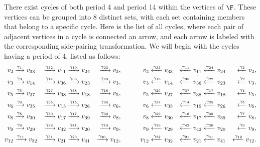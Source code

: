 There exist cycles of both period 4 and period 14 within the vertices of $\F$.
These vertices can be grouped into 8 distinct sets, with each set containing members that belong to a specific cycle.
Here is the list of all cycles, where each pair of adjacent vertices in a cycle is connected an arrow, and each arrow is labeled with the corresponding side-pairing transformation.
We will begin with the cycles having a period of 4, listed as follows:
\begin{alignat}{6}
v_{2}
& \xrightarrow{\gamma_{1}} v_{33}
& \xrightarrow{\gamma_{32}} v_{11}
& \xrightarrow{\gamma_{10}} v_{24}
& \xrightarrow{\gamma_{23}} v_{2},\qquad  &&
v_{2}
& \xleftarrow{\gamma_{33}} v_{33}
& \xleftarrow{\gamma_{11}} v_{11}
& \xleftarrow{\gamma_{24}} v_{24}
& \xleftarrow{\gamma_{2}} v_{2}, \notag \\
v_{3}
& \xrightarrow{\gamma_{3}} v_{14}
& \xrightarrow{\gamma_{14}} v_{36}
& \xrightarrow{\gamma_{36}} v_{23}
& \xrightarrow{\gamma_{23}} v_{3},\qquad &&
v_{3}
& \xleftarrow{\gamma_{13}} v_{14}
& \xleftarrow{\gamma_{35}} v_{36}
& \xleftarrow{\gamma_{22}} v_{23}
& \xleftarrow{\gamma_{2}} v_{3},\notag \\
v_{5}
& \xrightarrow{\gamma_{5}} v_{27}
& \xrightarrow{\gamma_{27}} v_{38}
& \xrightarrow{\gamma_{38}} v_{18}
& \xrightarrow{\gamma_{18}} v_{5},\qquad &&
v_{5}
& \xleftarrow{\gamma_{26}} v_{27}
& \xleftarrow{\gamma_{37}} v_{38}
& \xleftarrow{\gamma_{17}} v_{18}
& \xleftarrow{\gamma_{4}} v_{5}, \notag \\
v_{6}
& \xrightarrow{\gamma_{6}} v_{35}
& \xrightarrow{\gamma_{35}} v_{15}
& \xrightarrow{\gamma_{15}} v_{26}
& \xrightarrow{\gamma_{26}} v_{6},\qquad &&
v_{6}
& \xleftarrow{\gamma_{34}} v_{35}
& \xleftarrow{\gamma_{14}} v_{15}
& \xleftarrow{\gamma_{25}} v_{26}
& \xleftarrow{\gamma_{5}} v_{6}, \notag \\
v_{8}
& \xrightarrow{\gamma_{8}} v_{30}
& \xrightarrow{\gamma_{30}} v_{17}
& \xrightarrow{\gamma_{17}} v_{39}
& \xrightarrow{\gamma_{39}} v_{8},\qquad &&
v_{8}
& \xleftarrow{\gamma_{29}} v_{30}
& \xleftarrow{\gamma_{16}} v_{17}
& \xleftarrow{\gamma_{38}} v_{39}
& \xleftarrow{\gamma_{7}} v_{8}, \notag \\
v_{9}
& \xrightarrow{\gamma_{8}} v_{29}
& \xrightarrow{\gamma_{28}} v_{42}
& \xrightarrow{\gamma_{41}} v_{20}
& \xrightarrow{\gamma_{19}} v_{9},\qquad &&
v_{9}
& \xleftarrow{\gamma_{29}} v_{29}
& \xleftarrow{\gamma_{42}} v_{42}
& \xleftarrow{\gamma_{20}} v_{20}
& \xleftarrow{\gamma_{9}} v_{9}, \notag \\
v_{12}
& \xrightarrow{\gamma_{11}} v_{32}
& \xrightarrow{\gamma_{31}} v_{21}
& \xrightarrow{\gamma_{20}} v_{41}
& \xrightarrow{\gamma_{40}} v_{12},\qquad &&
v_{12}
& \xleftarrow{\gamma_{32}} v_{32}
& \xleftarrow{\gamma_{21}} v_{21}
& \xleftarrow{\gamma_{41}} v_{41}
& \xleftarrow{\gamma_{12}} v_{12}.
\label{eq:vertex_cycle1}
\end{alignat}

